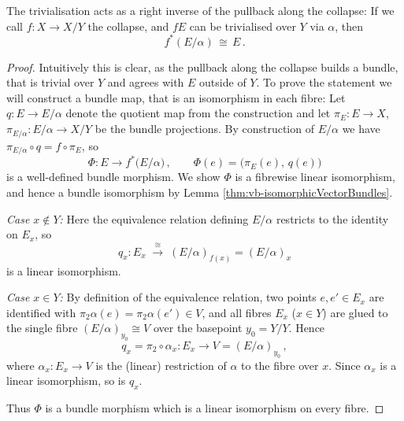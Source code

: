 \begin{corollary} \label{cor:kTheo-trivializationIsRightInverse}
	The trivialisation acts as a right inverse of the pullback along the collapse: If we call $f: X\to X\big/Y$ the collapse, and $fE$ can be trivialised over $Y$ via $\alpha$, then 
	\begin{equation*}
		f^*(E\big/ \alpha)\, \cong\, E\,.
	\end{equation*}
\end{corollary}
\begin{proof}
	Intuitively this is clear, as the pullback along the collapse builds a bundle, that is trivial over $Y$ and agrees with $E$ outside of $Y$. To prove the statement we will construct a bundle map, that is an isomorphism in each fibre: 
	Let $q:E\to E\big/\alpha$ denote the quotient map from the construction and let $\pi_E:E\to X$, $\pi_{E/\alpha}:E\big/\alpha\to X\big/Y$ be the bundle projections. By construction of $E\big/\alpha$ we have $\pi_{E/\alpha}\circ q = f\circ \pi_E$, so
    \begin{equation*}
        \Phi:E\to f^*\big(E\big/\alpha\big)\,,\qquad
        \Phi(e) = \big(\pi_E(e),\, q(e)\big)
    \end{equation*}
    is a well-defined bundle morphism. We show $\Phi$ is a fibrewise linear isomorphism, and hence a bundle isomorphism by Lemma \ref{thm:vb-isomorphicVectorBundles}.

    \emph{Case $x\notin Y$:} Here the equivalence relation defining $E/\alpha$ restricts to the identity on $E_x$, so
    \begin{equation*}
        q_{x}:E_x \;\xrightarrow{\ \cong\ }\; (E\big/\alpha)_{f(x)}=(E\big/\alpha)_x
    \end{equation*}
    is a linear isomorphism.

    \emph{Case $x\in Y$:} By definition of the equivalence relation, two points $e,e'\in E_x$ are identified with $\pi_2\alpha(e)=\pi_2\alpha(e')\in V$, and all fibres $E_x$ ($x\in Y$) are glued to the single fibre $(E/\alpha)_{y_0}\cong V$ over the basepoint $y_0=Y\big/Y$. Hence
    \begin{equation*}
        q_{x} = \pi_2\circ\alpha_x : E_x \rightarrow V = (E\big/\alpha)_{y_0}\,,
    \end{equation*}
    where $\alpha_x:E_x\to V$ is the (linear) restriction of $\alpha$ to the fibre over $x$. Since $\alpha_x$ is a linear isomorphism, so is $q_{x}$.

    Thus $\Phi$ is a bundle morphism which is a linear isomorphism on every fibre.
\end{proof}

